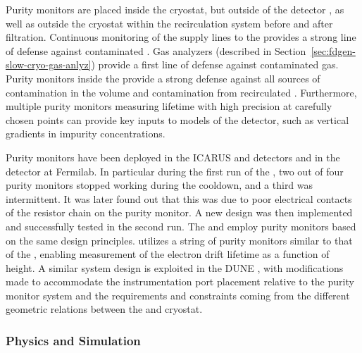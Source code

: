 Purity monitors are placed inside the cryostat, but outside of the detector , as well as outside the cryostat within the recirculation system before and after filtration. %
Continuous monitoring of  the  supply lines to the  provides a strong line of defense against contaminated \lar. Gas analyzers (described in Section~\ref{sec:fdgen-slow-cryo-gas-anlyz}) provide a first line of defense against contaminated gas.  Purity monitors inside the  provide a strong defense against all sources of contamination in the \lar volume and contamination from recirculated \lar. 
Furthermore, multiple purity monitors measuring lifetime with high precision at carefully chosen points can provide key inputs to  models of the detector, such as vertical gradients in impurity concentrations.

Purity monitors have been deployed in the ICARUS and \microboone detectors and in the  detector at Fermilab. In particular during the first run of the , two out of four purity monitors stopped working during the cooldown, and a third was intermittent. It was later found out that this was due to poor electrical contacts of the resistor chain on the purity monitor. A new design was then implemented and successfully tested in the second run. 
The  and  employ purity monitors based on the same design principles.  utilizes a string of purity monitors similar to that of the , enabling measurement of the electron drift lifetime as a function of height.  A similar system design is exploited in the DUNE , with modifications made to accommodate the instrumentation port placement relative to the purity monitor system and the requirements and constraints coming from the different geometric relations between the  and cryostat. 

\subsubsection{Physics and Simulation}

